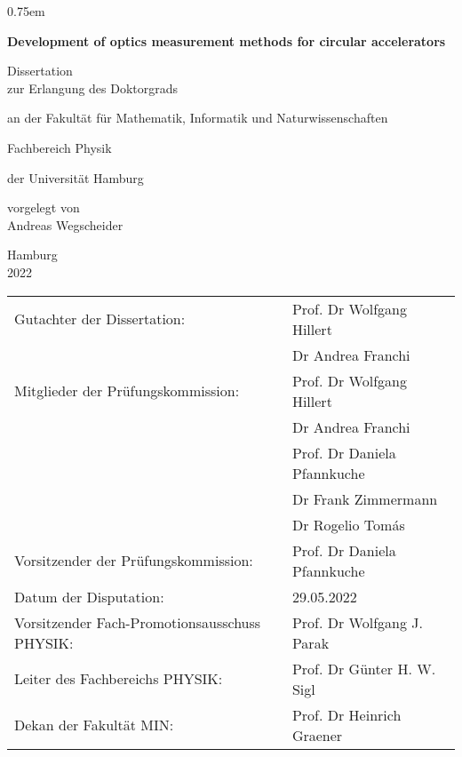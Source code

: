 \thispagestyle{empty}
\vspace{5cm}
\parskip0.75em
\begin{center}
    \Huge\bfseries
    Development of optics measurement methods for circular accelerators

    \vspace{3cm}
    \mdseries\Large
    Dissertation\\
    \vspace{1em}
    zur Erlangung des Doktorgrads

    an der Fakult\"at f\"ur Mathematik, Informatik und Naturwissenschaften
    
    Fachbereich Physik
    
    \vspace{1em}
    der Universit\"at Hamburg

    \vspace{2cm}
    \vfill
    vorgelegt von\\
    Andreas Wegscheider
    \vspace{2em}

    Hamburg\\
    2022
\end{center}
\cleardoublepage
{}

\thispagestyle{empty}
\renewcommand\baselinestretch{1.5}\selectfont
\begin{tabular}{ll}
   Gutachter der Dissertation:%
   & Prof. Dr Wolfgang Hillert\\
   & Dr Andrea Franchi \vspace{1em} \\ 
   Mitglieder der Prüfungskommission:%
   & Prof. Dr Wolfgang Hillert\\
   & Dr Andrea Franchi\\
   & Prof. Dr Daniela Pfannkuche \\
   & Dr Frank Zimmermann\\
   & Dr Rogelio Tom\'as \vspace{1.0em}  \\
   Vorsitzender der Prüfungskommission: & Prof. Dr Daniela Pfannkuche \vspace{1.0em}  \\
   Datum der Disputation: & 29.05.2022 \vspace{1.0em} \\
   Vorsitzender Fach-Promotionsausschuss PHYSIK: & Prof. Dr Wolfgang J. Parak \vspace{0.5em}  \\
   Leiter des Fachbereichs PHYSIK: & Prof. Dr Günter H. W. Sigl \vspace{0.5em}  \\
   Dekan der Fakultät MIN: & Prof. Dr Heinrich Graener
\end{tabular}

